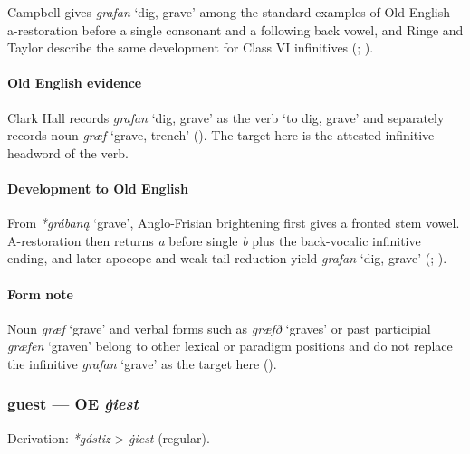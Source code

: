 \documentclass[
  british,
  a4paper,
]{article}
\providecommand{\Recon}[1]{\emph{*#1}}
\begin{document}
Campbell gives {\emph{grafan}} `dig, grave' among the standard examples
of Old English a-restoration before a single consonant and a following
back vowel, and Ringe and Taylor describe the same development for Class
VI infinitives (;
).

\paragraph{Old English evidence}\label{old-english-evidence-26}

Clark Hall records {\emph{grafan}} `dig, grave' as the verb `to dig,
grave' and separately records noun \emph{græf} `grave, trench'
(). The target here is the
attested infinitive headword of the verb.

\paragraph{Development to Old
English}\label{development-to-old-english-26}

From \Recon{grábaną} `grave', Anglo-Frisian brightening first gives a
fronted stem vowel. A-restoration then returns \emph{a} before single
\emph{b} plus the back-vocalic infinitive ending, and later apocope and
weak-tail reduction yield {\emph{grafan}} `dig, grave'
(;
).

\paragraph{Form note}\label{form-note-4}

Noun \emph{græf} `grave' and verbal forms such as \emph{græfð} `graves'
or past participial \emph{græfen} `graven' belong to other lexical or
paradigm positions and do not replace the infinitive \emph{grafan}
`grave' as the target here ().

\subsubsection{\texorpdfstring{guest --- OE
\emph{ġiest}}{guest --- OE ġiest}}\label{guest-oe-ux121iest}

Derivation: \emph{*gástiz} \textgreater{} \emph{ġiest} (regular).
\end{document}
